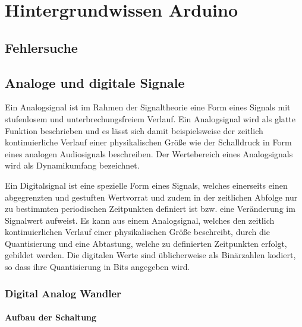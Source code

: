 \chapter{Hintergrundwissen Arduino}


\section{Fehlersuche}


\section{Analoge und digitale Signale}

Ein Analogsignal ist im Rahmen der Signaltheorie eine Form eines Signals mit stufenlosem und unterbrechungsfreiem Verlauf. Ein Analogsignal wird als glatte Funktion beschrieben und es lässt sich damit beispielsweise der zeitlich kontinuierliche Verlauf einer physikalischen Größe wie der Schalldruck in Form eines analogen Audiosignals beschreiben. Der Wertebereich eines Analogsignals wird als Dynamikumfang bezeichnet.


Ein Digitalsignal  ist eine spezielle Form eines Signals, welches einerseits einen abgegrenzten und gestuften Wertvorrat und zudem in der zeitlichen Abfolge nur zu bestimmten periodischen Zeitpunkten definiert ist bzw. eine Veränderung im Signalwert aufweist. Es kann aus einem Analogsignal, welches den zeitlich kontinuierlichen Verlauf einer physikalischen Größe beschreibt, durch die Quantisierung und eine Abtastung, welche zu definierten Zeitpunkten erfolgt, gebildet werden. Die digitalen Werte sind üblicherweise als Binärzahlen kodiert, so dass ihre Quantisierung in Bits angegeben wird.
\subsection{Digital Analog Wandler}


\subsubsection{Aufbau der Schaltung}

